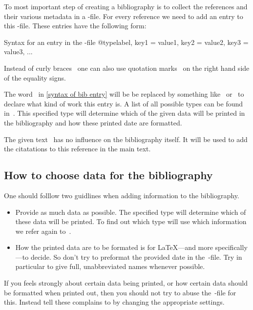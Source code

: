 \begin{refsection}
To most important step of creating a bibliography is to collect the references and their various metadata in a -file.
For every reference we need to add an entry to this -file.
These entries have the following form:
\begin{showcode}[label = {syntax of bib entry}]{Syntax for an entry in the -file}
@type{label,
  key1 = {value1},
  key2 = {value2},
  key3 = {value3},
  ...
}
\end{showcode}
Instead of curly braces~\inlinecode{\{ \}} one can also use quotation marks~ on the right hand side of the equality signs.

The word~ in \cref{syntax of bib entry} will be be replaced by something like~ or~ to declare what kind of work this entry is.
A list of all possible types can be found in~\cite[2.1]{biblatex}.
This specified type will determine which of the given data will be printed in the bibliography and how these printed date are formatted.

The given text~ has no influence on the bibliography itself.
It will be used to add the citatations to this reference in the main text.

\subsection{How to choose data for the bibliography}

One should folllow two guidlines when adding information to the bibliography.
\begin{itemize}
  \item
    Provide as much data as possible.
    The specified type will determine which of these data will be printed.
    To find out which type will use which information we refer again to~\cite[2.1, 2.2]{biblatex}.
  \item
    How the printed data are to be formated is for {\LaTeX}---and more specifically ---to decide.
    So don’t try to preformat the provided date in the~-file.
    Try in particular to give full, unabbreviated names whenever possible.
\end{itemize}
If you feels strongly about certain data being printed, or how certain data should be formatted when printed out, then you should not try to abuse the~-file for this.
Instead tell these complains to  by changing the appropriate settings.


\end{refsection}
